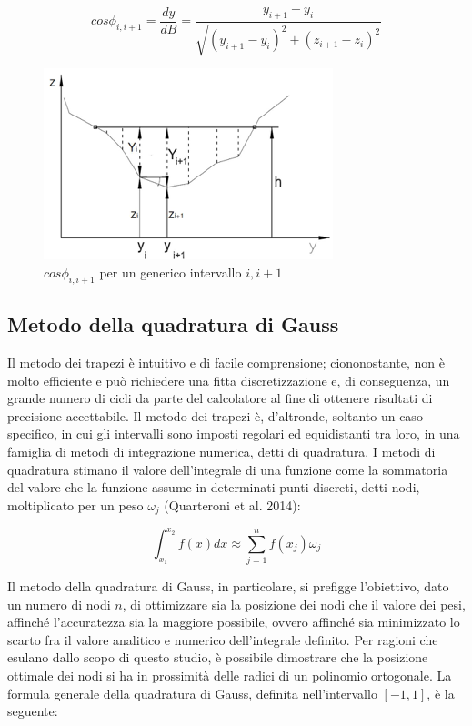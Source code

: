 \documentclass[12pt]{article} %
\begin{document}
\begin{equation}
    cos\phi_{i,i+1} = \frac{dy}{dB} = \frac{y_{i+1}-y_{i}}{\sqrt{(y_{i+1}-y_{i})^2+(z_{i+1}-z_{i})^2}}
\end{equation}

\begin{figure}
    \centering
    \includegraphics[scale=1.5]{suddivisione alveo.png}
    \caption{$cos\phi_{i,i+1}$ per un generico intervallo $i,i+1$}
    \label{fig:suddivisione_alveo}
\end{figure}

\subsection{Metodo della quadratura di Gauss}

\noindent Il metodo dei trapezi è intuitivo e di facile comprensione; ciononostante, non è molto efficiente e può richiedere una fitta discretizzazione e, di conseguenza, un grande numero di cicli da parte del calcolatore al fine di ottenere risultati di precisione accettabile. 
Il metodo dei trapezi è, d’altronde, soltanto un caso specifico, in cui gli intervalli sono imposti regolari ed equidistanti tra loro, in una famiglia di metodi di integrazione numerica, detti di quadratura. I metodi di quadratura stimano il valore dell’integrale di una funzione come la sommatoria del valore che la funzione assume in determinati punti discreti, detti nodi, moltiplicato per un peso $\omega_{j}$ (Quarteroni et al. 2014):

\begin{equation}
    \int_{x_1}^{x_2} f(x)dx\approx\sum_{j=1}^n f(x_j)\omega_j
    \label{eqn:formule_quadratura}
\end{equation}

\noindent Il metodo della quadratura di Gauss, in particolare, si prefigge l’obiettivo, dato un numero di nodi $n$, di ottimizzare sia la posizione dei nodi che il valore dei pesi, affinché l’accuratezza sia la maggiore possibile, ovvero affinché sia minimizzato lo scarto fra il valore analitico e numerico dell’integrale definito. Per ragioni che esulano dallo scopo di questo studio, è possibile dimostrare che la posizione ottimale dei nodi si ha in prossimità delle radici di un polinomio ortogonale. 
La formula generale della quadratura di Gauss, definita nell’intervallo $[-1,1]$, è la seguente:
\end{document}
